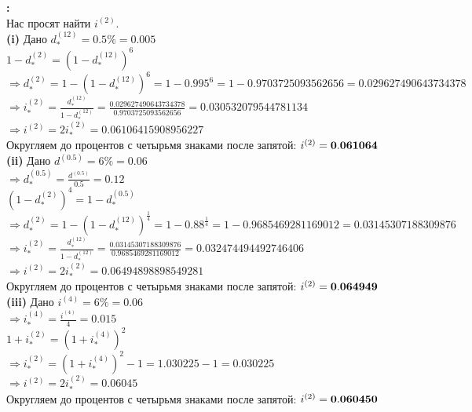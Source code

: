 \documentclass{article}
\begin{document}
{\bf {}:}\\
Нас просят найти $i^{(2)}.$ \\

{\bf \large  (i)} Дано $d_{*}^{(12)} = 0.5\% = 0.005$\\
$1-d_{*}^{(2)} =(1-d_{*}^{(12)} )^{6}$\\
$\Rightarrow d_{*}^{(2)} =1- (1-d_{*}^{(12)} )^{6} = 1- 0.995^{6} = 1- 0.9703725093562656 =0.029627490643734378 $\\
$\Rightarrow i_{*}^{(2)} =\frac {d_{*}^{(12)}} {1-d_{*}^{(12)} } = \frac {0.029627490643734378} {0.9703725093562656} = 0.030532079544781134 $\\
$\Rightarrow i^{(2)} = 2i_{*}^{(2)}  = 0.06106415908956227$\\
Округляем до процентов с четырьмя знаками после запятой: $ i^{(2)}  = \bf  0.061064 $\\

{\bf \large  (ii)} Дано $d^{(0.5)} = 6\% = 0.06$\\
$\Rightarrow d_{*}^{(0.5)} = \frac{d^{(0.5)} }{0.5} = 0.12$\\
$(1-d_{*}^{(2)})^4=1-d_{*}^{(0.5)} $\\
$\Rightarrow d_{*}^{(2)} =1-(1-d_{*}^{(12)} )^{\frac {1} { 4}} = 1-0.88^{\frac {1} {4}} = 1- 0.9685469281169012 = 0.03145307188309876 $\\
$\Rightarrow i_{*}^{(2)} =\frac {d_{*}^{(12)}} {1-d_{*}^{(12)} } = \frac {0.03145307188309876} {0.9685469281169012} = 0.032474494492746406$\\
$\Rightarrow i^{(2)} = 2i_{*}^{(2)}  = 0.06494898898549281$\\
Округляем до процентов с четырьмя знаками после запятой: $ i^{(2)}  = \bf   0.064949$\\

{\bf \large  (iii)} Дано $i^{(4)} = 6\% = 0.06$\\
$\Rightarrow i_{*}^{(4)} = \frac{ i^{(4)} }{4} = 0.015$\\
$1+i_{*}^{(2)}=(1+i_{*}^{(4)})^2 $\\
$\Rightarrow i_{*}^{(2)} = (1+i_{*}^{(4)})^2 -1 = 1.030225 - 1 = 0.030225$\\
$\Rightarrow i^{(2)} = 2i_{*}^{(2)}  =  0.06045$\\
Округляем до процентов с четырьмя знаками после запятой: $ i^{(2)}  = \bf   0.060450$\\
\end{document}
